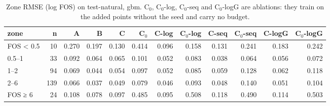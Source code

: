 \begin{table}[htbp]
\centering
\small
\setlength{\tabcolsep}{4pt}
\caption{Zone RMSE (log FOS) on test-natural, gbm. C$_0$, C$_0$-log, C$_0$-seq and C$_0$-logG are ablations: they train on the added points without the seed and carry no budget.}
\label{tab:test-natural__log-rmse:zones_log:gbm}
\begin{tabular}{lrrrrrrrrrrr}
\toprule
zone & n & A & B & C & C$_0$ & C-log & C$_0$-log & C-seq & C$_0$-seq & C-logG & C$_0$-logG \\
\midrule
FOS < 0.5 & 10 & 0.270 & 0.197 & 0.130 & 0.414 & 0.096 & 0.158 & 0.131 & 0.241 & 0.183 & 0.242 \\
0.5–1 & 33 & 0.092 & 0.064 & 0.065 & 0.101 & 0.052 & 0.083 & 0.038 & 0.064 & 0.056 & 0.072 \\
1–2 & 94 & 0.069 & 0.044 & 0.054 & 0.097 & 0.052 & 0.085 & 0.059 & 0.128 & 0.062 & 0.118 \\
2–6 & 139 & 0.066 & 0.037 & 0.049 & 0.079 & 0.046 & 0.093 & 0.048 & 0.140 & 0.051 & 0.104 \\
FOS ≥ 6 & 24 & 0.108 & 0.078 & 0.097 & 0.485 & 0.095 & 0.508 & 0.118 & 0.490 & 0.114 & 0.503 \\
\bottomrule
\end{tabular}
\end{table}
